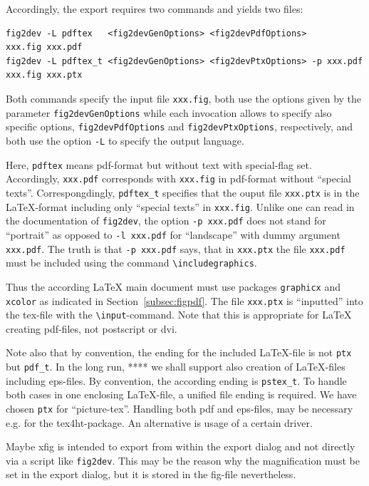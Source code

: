 \documentclass[12pt]{article}
\begin{document}
Accordingly, the export requires two commands and yields two files: 
%
\begin{Verbatim}[fontsize=\scriptsize]
fig2dev -L pdftex   <fig2devGenOptions> <fig2devPdfOptions>            xxx.fig xxx.pdf   
fig2dev -L pdftex_t <fig2devGenOptions> <fig2devPtxOptions> -p xxx.pdf xxx.fig xxx.ptx
\end{Verbatim}
%
Both commands specify the input file {\tt xxx.fig}, 
both use the options given by the parameter {\tt fig2devGenOptions} 
while each invocation allows to specify also specific options, 
{\tt fig2devPdfOptions} and {\tt fig2devPtxOptions}, respectively, 
and both use the option {\tt -L} to specify the output language. 

Here, {\tt pdftex} means pdf-format but without text with special-flag set. 
Accordingly, {\tt xxx.pdf} corresponds with {\tt xxx.fig} in pdf-format 
without ``special texts''. 
Correspongdingly, {\tt pdftex\_t} specifies 
that the ouput file {\tt xxx.ptx} is in the \LaTeX-format 
including only ``special texts'' in {\tt xxx.fig}. 
Unlike one can read in the documentation of {\tt fig2dev}, 
the option {\tt -p xxx.pdf} does not stand for ``portrait'' 
as opposed to {\tt -l xxx.pdf} for ``landscape'' 
with dummy argument {\tt xxx.pdf}. 
The truth is that {\tt -p xxx.pdf} says, 
that in {\tt xxx.ptx} the file {\tt xxx.pdf} must be included 
using the command {\tt\textbackslash includegraphics}. 

Thus the according \LaTeX{} main document 
must use packages {\tt graphicx} and {\tt xcolor} 
as indicated in Section~\ref{subsec:figpdf}. 
The file {\tt xxx.ptx} is ``inputted'' into the tex-file 
with the {\tt\textbackslash input}-command. 
Note that this is appropriate for \LaTeX{} creating pdf-files, 
not postscript or dvi. 

Note also that by convention, the ending for the included \LaTeX-file 
is not {\tt ptx} but {\tt pdf\_t}. 
In the long run, **** we shall support also creation of \LaTeX-files 
including \gls{eps}-files. 
By convention, the according ending is {\tt pstex\_t}. 
To handle both cases in one enclosing \LaTeX-file, 
a unified file ending is required. 
We have chosen {\tt ptx} for ``picture-tex''. 
Handling both \gls{pdf} and \gls{eps}-files, 
may be necessary e.g. for the tex4ht-package. 
An alternative is usage of a certain driver. 


Maybe xfig is intended to export from within the export dialog 
and not directly via a script like {\tt fig2dev}. 
This may be the reason 
why the magnification must be set in the export dialog, 
but it is stored in the fig-file nevertheless. 
\end{document}

